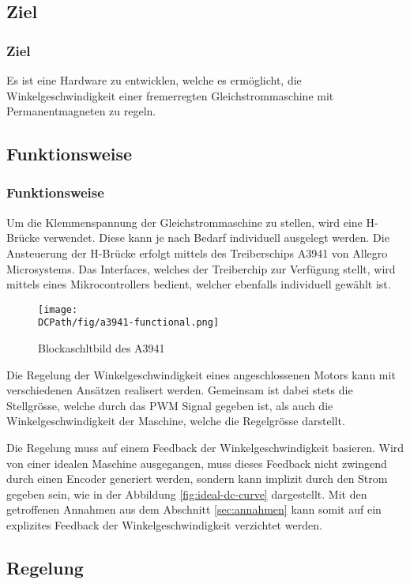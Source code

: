 \ifSTANDALONE
\subsection{Ziel}
\fi
\ifEMBED
\subsubsection{Ziel}
\fi
Es ist eine Hardware zu entwicklen, welche es ermöglicht, die
Winkelgeschwindigkeit einer fremerregten Gleichstrommaschine mit
Permanentmagneten zu regeln.

\ifSTANDALONE
\subsection{Funktionsweise}
\fi
\ifEMBED
\subsubsection{Funktionsweise}
\fi
Um die Klemmenspannung der Gleichstrommaschine zu stellen, wird eine
H-Brücke verwendet. Diese kann je nach Bedarf individuell ausgelegt
werden. Die Ansteuerung der H-Brücke erfolgt mittels des Treiberschips
A3941 von Allegro Microsystems. Das Interfaces, welches der
Treiberchip zur Verfügung stellt, wird mittels eines Mikrocontrollers
bedient, welcher ebenfalls individuell gewählt ist.

\begin{figure}[h!]
	\centering
	\texttt{[image: \\DCPath/fig/a3941-functional.png]}
	\caption{Blockaschltbild des A3941}
	\label{fig:a3941-functional}
\end{figure}

Die Regelung der Winkelgeschwindigkeit eines angeschlossenen Motors kann
mit verschiedenen Ansätzen realisert werden. Gemeinsam ist dabei stets die
Stellgrösse, welche durch das PWM Signal gegeben ist, als auch die
Winkelgeschwindigkeit der Maschine, welche die Regelgrösse darstellt.

Die Regelung muss auf einem Feedback der Winkelgeschwindigkeit basieren.
Wird von einer idealen Maschine ausgegangen, muss dieses Feedback nicht
zwingend durch einen Encoder generiert werden, sondern kann implizit durch
den Strom gegeben sein, wie in der Abbildung \ref{fig:ideal-dc-curve}
dargestellt. Mit den getroffenen Annahmen aus dem Abschnitt
\ref{sec:annahmen} kann somit auf ein explizites Feedback der
Winkelgeschwindigkeit verzichtet werden. 

\ifSTANDALONE
\subsection{Regelung}
\fi
\ifEMBED

